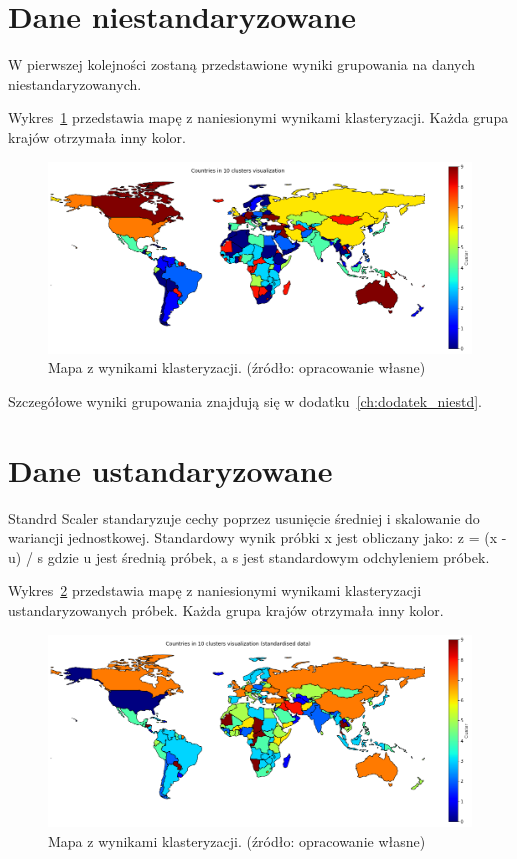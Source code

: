 \documentclass[11pt]{report}
\begin{document}
    \section{Dane niestandaryzowane}\label{sec:dane-niestandaryzowane}
    W pierwszej kolejności zostaną przedstawione wyniki grupowania na danych niestandaryzowanych.

    Wykres~\ref{fig:clust10} przedstawia mapę z naniesionymi wynikami klasteryzacji.
    Każda grupa krajów otrzymała inny kolor.

    \begin{figure}[!htp]
        \centering
        \includegraphics[width=\linewidth]{fig/CLUST/10clusterMap.png}
        \caption{Mapa z wynikami klasteryzacji. (źródło: opracowanie własne)}
        \label{fig:clust10}
    \end{figure}

    Szczegółowe wyniki grupowania znajdują się w dodatku~\ref{ch:dodatek_niestd}.


    \section{Dane ustandaryzowane}\label{sec:dane-ustandaryzowane}
    Standrd Scaler standaryzuje cechy poprzez usunięcie średniej i skalowanie do wariancji jednostkowej.
    Standardowy wynik próbki x jest obliczany jako:
    z = (x - u) / s
    gdzie u jest średnią próbek, a s jest standardowym odchyleniem próbek.

    Wykres~\ref{fig:clust10std} przedstawia mapę z naniesionymi wynikami klasteryzacji ustandaryzowanych próbek.
    Każda grupa krajów otrzymała inny kolor.

    \begin{figure}[!htp]
        \centering
        \includegraphics[width=\linewidth]{fig/CLUST/10clusterMap_std.png}
        \caption{Mapa z wynikami klasteryzacji. (źródło: opracowanie własne)}
        \label{fig:clust10std}
    \end{figure}
\end{document}
